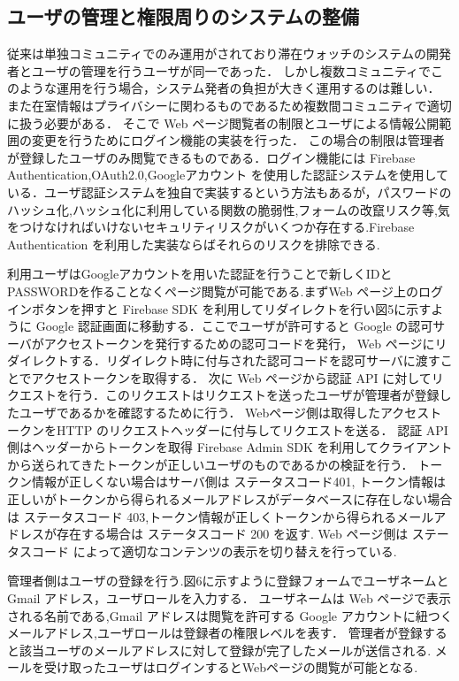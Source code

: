 
\subsection{ユーザの管理と権限周りのシステムの整備}
従来は単独コミュニティでのみ運用がされており滞在ウォッチのシステムの開発者とユーザの管理を行うユーザが同一であった．
しかし複数コミュニティでこのような運用を行う場合，システム発者の負担が大きく運用するのは難しい．
また在室情報はプライバシーに関わるものであるため複数間コミュニティで適切に扱う必要がある．
そこで Web ページ閲覧者の制限とユーザによる情報公開範囲の変更を行うためにログイン機能の実装を行った．
この場合の制限は管理者が登録したユーザのみ閲覧できるものである．ログイン機能には Firebase Authentication,OAuth2.0,Googleアカウント を使用した認証システムを使用している．ユーザ認証システムを独自で実装するという方法もあるが，パスワードのハッシュ化,ハッシュ化に利用している関数の脆弱性,フォームの改竄リスク等,気をつけなければいけないセキュリティリスクがいくつか存在する.Firebase Authentication を利用した実装ならばそれらのリスクを排除できる.

利用ユーザはGoogleアカウントを用いた認証を行うことで新しくIDとPASSWORDを作ることなくページ閲覧が可能である.まずWeb ページ上のログインボタンを押すと Firebase SDK を利用してリダイレクトを行い図5に示すように Google 認証画面に移動する．ここでユーザが許可すると Google の認可サーバがアクセストークンを発行するための認可コードを発行， Web ページにリダイレクトする．リダイレクト時に付与された認可コードを認可サーバに渡すことでアクセストークンを取得する．
次に Web ページから認証 API に対してリクエストを行う．このリクエストはリクエストを送ったユーザが管理者が登録したユーザであるかを確認するために行う．
Webページ側は取得したアクセストークンをHTTP のリクエストヘッダーに付与してリクエストを送る．
認証 API 側はヘッダーからトークンを取得 Firebase Admin SDK を利用してクライアントから送られてきたトークンが正しいユーザのものであるかの検証を行う．
トークン情報が正しくない場合はサーバ側は ステータスコード401,
トークン情報は正しいがトークンから得られるメールアドレスがデータベースに存在しない場合は ステータスコード 403,トークン情報が正しくトークンから得られるメールアドレスが存在する場合は ステータスコード 200 を返す.
Web ページ側は ステータスコード によって適切なコンテンツの表示を切り替えを行っている.



管理者側はユーザの登録を行う.図6に示すように登録フォームでユーザネームと Gmail アドレス，ユーザロールを入力する．
ユーザネームは Web ページで表示される名前である,Gmail アドレスは閲覧を許可する Google アカウントに紐つくメールアドレス,ユーザロールは登録者の権限レベルを表す．
管理者が登録すると該当ユーザのメールアドレスに対して登録が完了したメールが送信される.
メールを受け取ったユーザはログインするとWebページの閲覧が可能となる.